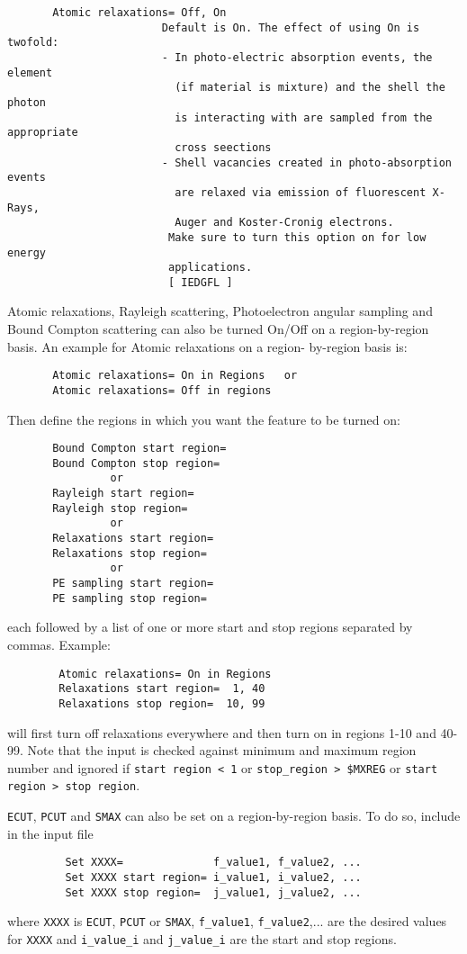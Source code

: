 \begin{verbatim}
       Atomic relaxations= Off, On
                        Default is On. The effect of using On is twofold:
                        - In photo-electric absorption events, the element
                          (if material is mixture) and the shell the photon
                          is interacting with are sampled from the appropriate
                          cross seections
                        - Shell vacancies created in photo-absorption events
                          are relaxed via emission of fluorescent X-Rays,
                          Auger and Koster-Cronig electrons.
                         Make sure to turn this option on for low energy
                         applications.
                         [ IEDGFL ]
\end{verbatim}

\noindent
Atomic relaxations, Rayleigh scattering, Photoelectron angular sampling 
and Bound Compton scattering can also be turned On/Off on a 
region-by-region basis. An example for Atomic relaxations on a region-
by-region basis is:

\begin{verbatim}
       Atomic relaxations= On in Regions   or
       Atomic relaxations= Off in regions
\end{verbatim}

Then define the regions in which you want the feature to be turned on:

\begin{verbatim}
       Bound Compton start region=
       Bound Compton stop region=
                or
       Rayleigh start region=
       Rayleigh stop region=
                or
       Relaxations start region=
       Relaxations stop region=
                or
       PE sampling start region=
       PE sampling stop region=
\end{verbatim}
each followed by a list of one or more start and stop regions 
separated by commas. Example:
\begin{verbatim}
        Atomic relaxations= On in Regions
        Relaxations start region=  1, 40
        Relaxations stop region=  10, 99
\end{verbatim}
will first turn off relaxations everywhere and
then turn on in regions 1-10 and 40-99.
Note that the input is checked against minimum and maximum
region number and ignored if
\verb+start region < 1+ or \verb+stop_region > $MXREG+ or
\verb+start region > stop region+.

\verb+ECUT+, \verb+PCUT+ and \verb+SMAX+ can also be set on a 
region-by-region basis. To do so, include in the input file
\begin{verbatim}
         Set XXXX=              f_value1, f_value2, ...
         Set XXXX start region= i_value1, i_value2, ...
         Set XXXX stop region=  j_value1, j_value2, ...
\end{verbatim}
where \verb+XXXX+ is \verb+ECUT+, \verb+PCUT+ or \verb+SMAX+, 
\verb+f_value1+, \verb+f_value2+,... 
are the desired values for \verb+XXXX+ and \verb+i_value_i+ and 
\verb+j_value_i+ are the start and stop regions.
